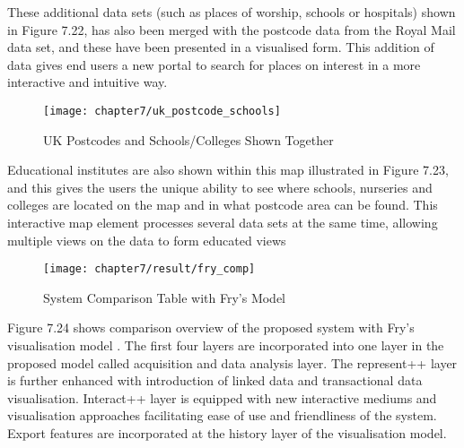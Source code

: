 These additional data sets (such as places of worship, schools or hospitals) shown in Figure 7.22, has also been merged with the postcode data from the Royal Mail data set, and these have been presented in a visualised form. This addition of data gives end users a new portal to search for places on interest in a more interactive and intuitive way.

\begin{figure}[H]
\centering
\texttt{[image: chapter7/uk\_postcode\_schools]}
\caption{ UK Postcodes and Schools/Colleges Shown Together}
\end{figure}

Educational institutes are also shown within this map illustrated in Figure 7.23, and this gives the users the unique ability to see where schools, nurseries and colleges are located on the map and in what postcode area can be found. This interactive map element processes several data sets at the same time, allowing multiple views on the data to form educated views

\begin{figure}
\centering
\texttt{[image: chapter7/result/fry\_comp]}
\caption{System Comparison Table with Fry's Model}
\end{figure}

Figure 7.24 shows comparison overview of the proposed system with Fry's visualisation model \cite{fry}. The first four layers are incorporated into one layer in the proposed model called acquisition and data analysis layer. The represent++ layer is further enhanced with introduction of linked data and transactional data visualisation. Interact++ layer is equipped with new interactive mediums and visualisation approaches facilitating ease of use and friendliness of the system. Export features are incorporated at the history layer of the visualisation model. \\


